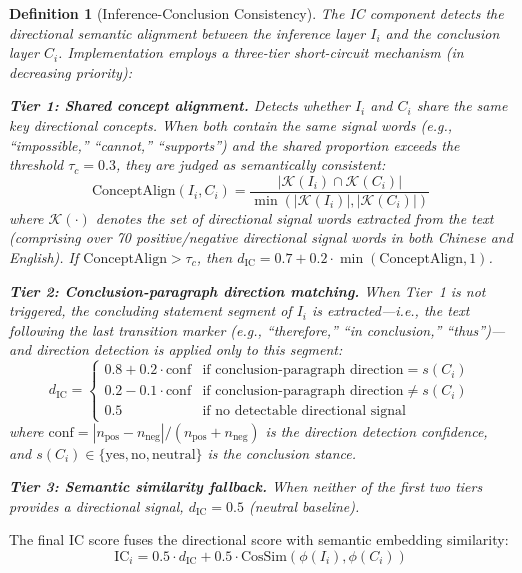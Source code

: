 \documentclass[12pt,a4paper]{article}
\newtheorem{definition}{Definition}[section]
\begin{document}
\begin{definition}[Inference-Conclusion Consistency]\label{def:ic}
The IC component detects the directional semantic alignment between the inference layer $I_i$ and the conclusion layer $C_i$. Implementation employs a three-tier short-circuit mechanism (in decreasing priority):

\textbf{Tier 1: Shared concept alignment.} Detects whether $I_i$ and $C_i$ share the same key directional concepts. When both contain the same signal words (e.g., ``impossible,'' ``cannot,'' ``supports'') and the shared proportion exceeds the threshold $\tau_c = 0.3$, they are judged as semantically consistent:
\begin{equation}
\text{ConceptAlign}(I_i, C_i) = \frac{|\mathcal{K}(I_i) \cap \mathcal{K}(C_i)|}{\min(|\mathcal{K}(I_i)|, |\mathcal{K}(C_i)|)}
\end{equation}
where $\mathcal{K}(\cdot)$ denotes the set of directional signal words extracted from the text (comprising over 70 positive/negative directional signal words in both Chinese and English). If $\text{ConceptAlign} > \tau_c$, then $d_{\text{IC}} = 0.7 + 0.2 \cdot \min(\text{ConceptAlign}, 1)$.

\textbf{Tier 2: Conclusion-paragraph direction matching.} When Tier~1 is not triggered, the concluding statement segment of $I_i$ is extracted---i.e., the text following the last transition marker (e.g., ``therefore,'' ``in conclusion,'' ``thus'')---and direction detection is applied only to this segment:
\begin{equation}
d_{\text{IC}} = \begin{cases}
0.8 + 0.2 \cdot \text{conf} & \text{if conclusion-paragraph direction} = s(C_i) \\
0.2 - 0.1 \cdot \text{conf} & \text{if conclusion-paragraph direction} \neq s(C_i) \\
0.5 & \text{if no detectable directional signal}
\end{cases}
\end{equation}
where $\text{conf} = |n_{\text{pos}} - n_{\text{neg}}| / (n_{\text{pos}} + n_{\text{neg}})$ is the direction detection confidence, and $s(C_i) \in \{\text{yes}, \text{no}, \text{neutral}\}$ is the conclusion stance.

\textbf{Tier 3: Semantic similarity fallback.} When neither of the first two tiers provides a directional signal, $d_{\text{IC}} = 0.5$ (neutral baseline).
\end{definition}

The final IC score fuses the directional score with semantic embedding similarity:
\begin{equation}\label{eq:ic}
\text{IC}_i = 0.5 \cdot d_{\text{IC}} + 0.5 \cdot \text{CosSim}(\phi(I_i), \phi(C_i))
\end{equation}
\end{document}
